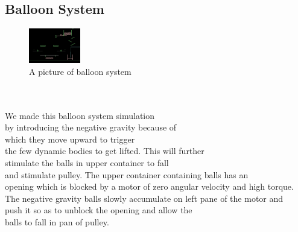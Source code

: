 \subsection{Balloon System}
\begin{figure}
	\caption{A picture of balloon system}
	\centering
	 \includegraphics[width=0.2\textwidth]{./doc/balloon.png}%
\end{figure}
\begin{frame}
\centering
\\
\\
We made this balloon system simulation\\by introducing the negative gravity because of \\which they move upward to trigger \\the few dynamic bodies to get lifted. This will further \\stimulate the balls in upper container to fall \\and stimulate pulley. The upper container containing balls has an \\opening which is blocked by a motor of zero angular velocity and high torque. \\The negative gravity balls slowly accumulate on left pane of the motor and\\ push it so as to unblock the opening and allow the \\balls to fall in pan of pulley.
\end{frame}
\\
\\
